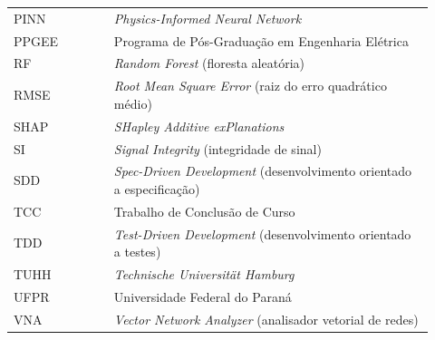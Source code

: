 \begin{listaabrev}
\begin{longtable}[l]{p{0.22\linewidth}p{0.70\linewidth}}
PINN & \textit{Physics-Informed Neural Network}\\
PPGEE & Programa de Pós-Graduação em Engenharia Elétrica\\
RF & \textit{Random Forest} (floresta aleatória)\\
RMSE & \textit{Root Mean Square Error} (raiz do erro quadrático médio)\\
SHAP & \textit{SHapley Additive exPlanations}\\
SI & \textit{Signal Integrity} (integridade de sinal)\\
SDD & \textit{Spec-Driven Development} (desenvolvimento orientado a especificação)\\
TCC & Trabalho de Conclusão de Curso\\
TDD & \textit{Test-Driven Development} (desenvolvimento orientado a testes)\\
TUHH & \textit{Technische Universität Hamburg}\\
UFPR & Universidade Federal do Paraná\\
VNA & \textit{Vector Network Analyzer} (analisador vetorial de redes)\\
\end{longtable}

\end{listaabrev}

